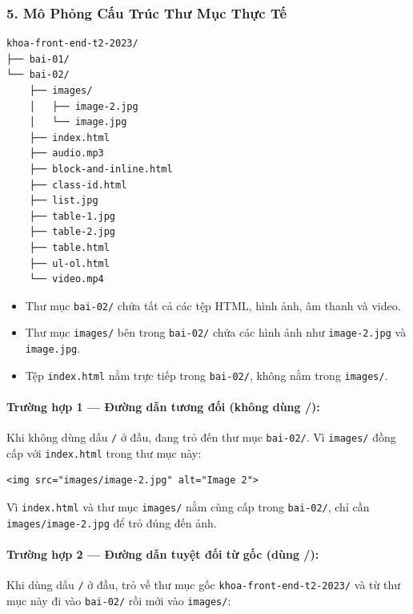 \documentclass[11pt,oneside]{book}
\newcommand{\codeinline}[1]{\textcolor{accentOrange}{\texttt{#1}}}
\begin{document}
\subsubsection{5. Mô Phỏng Cấu Trúc Thư Mục Thực Tế}

\begin{codeWindow}
\begin{lstlisting}[language=HTML5]
khoa-front-end-t2-2023/
├── bai-01/
└── bai-02/
    ├── images/
    │   ├── image-2.jpg
    │   └── image.jpg
    ├── index.html
    ├── audio.mp3
    ├── block-and-inline.html
    ├── class-id.html
    ├── list.jpg
    ├── table-1.jpg
    ├── table-2.jpg
    ├── table.html
    ├── ul-ol.html
    └── video.mp4
\end{lstlisting}
\end{codeWindow}

\begin{itemize}[leftmargin=1.5em, itemsep=3pt, parsep=0pt]
    \item Thư mục \codeinline{bai-02/} chứa tất cả các tệp HTML, hình ảnh, âm thanh và video.
    \item Thư mục \codeinline{images/} bên trong \codeinline{bai-02/} chứa các hình ảnh như \codeinline{image-2.jpg} và \codeinline{image.jpg}.
    \item Tệp \codeinline{index.html} nằm trực tiếp trong \codeinline{bai-02/}, không nằm trong \codeinline{images/}.
\end{itemize}

\paragraph{Trường hợp 1 — Đường dẫn tương đối (không dùng /):}
Khi không dùng dấu \codeinline{/} ở đầu, đang trỏ đến thư mục \codeinline{bai-02/}. Vì \codeinline{images/} đồng cấp với \codeinline{index.html} trong thư mục này:

\begin{codeWindow}
\begin{lstlisting}[language=HTML5]
<img src="images/image-2.jpg" alt="Image 2">
\end{lstlisting}
\end{codeWindow}

Vì \codeinline{index.html} và thư mục \codeinline{images/} nằm cùng cấp trong \codeinline{bai-02/}, chỉ cần \codeinline{images/image-2.jpg} để trỏ đúng đến ảnh.

\paragraph{Trường hợp 2 — Đường dẫn tuyệt đối từ gốc (dùng /):}
Khi dùng dấu \codeinline{/} ở đầu, trỏ về thư mục gốc \codeinline{khoa-front-end-t2-2023/} và từ thư mục này đi vào \codeinline{bai-02/} rồi mới vào \codeinline{images/}:
\end{document}
